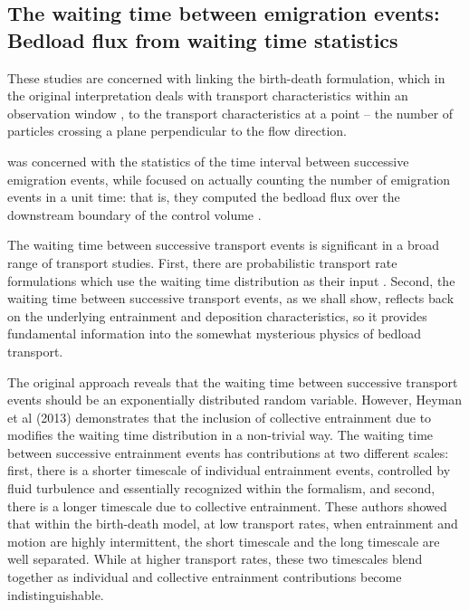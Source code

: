 
\subsection{The waiting time between emigration events: Bedload flux from waiting time statistics} 

These studies are concerned with linking the birth-death formulation, which in the original interpretation deals with transport characteristics within an observation window \citep{Ancey2008}, to the transport characteristics at a point -- the number of particles crossing a plane perpendicular to the flow direction. 

\citet{Heyman2013} was concerned with the statistics of the time interval between successive emigration events, while \citet{Ma2014b} focused on actually counting the number of emigration events in a unit time: that is, they computed the bedload flux over the downstream boundary of the control volume \citet{Ancey2008}. 

The waiting time between successive transport events is significant in a broad range of transport studies. 
First, there are probabilistic transport rate formulations which use the waiting time distribution as their input \citep{Turowski2010}. 
Second, the waiting time between successive transport events, as we shall show, reflects back on the underlying entrainment and deposition characteristics, so it provides fundamental information into the somewhat mysterious physics of bedload transport.

The original \citet{Einstein1937,Einstein1950} approach reveals that the waiting time between successive transport events should be an exponentially distributed random variable. 
However, Heyman et al (2013) demonstrates that the inclusion of collective entrainment due to \citet{Ancey2008} modifies the waiting time distribution in a non-trivial way. 
The waiting time between successive entrainment events has contributions at two different scales: first, there is a shorter timescale of individual entrainment events, controlled by fluid turbulence and essentially recognized within the \citet{Einstein1937} formalism, and second, there is a longer timescale due to collective entrainment.
These authors showed that within the \citet{Ancey2008} birth-death model, at low transport rates, when entrainment and motion are highly intermittent, the short timescale and the long timescale are well separated. 
While at higher transport rates, these two timescales blend together as individual and collective entrainment contributions become indistinguishable. 

